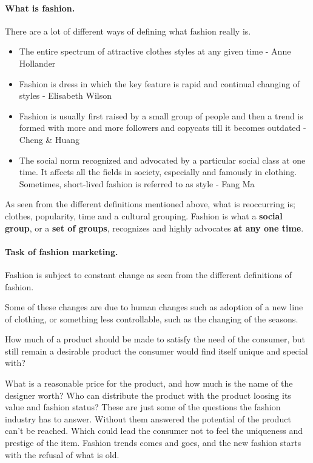 \paragraph{What is fashion.}

There are a lot of different ways of defining what fashion really is.

\begin{itemize}
    \item The entire spectrum of attractive clothes styles at any given time -
    Anne Hollander
    \item Fashion is dress in which the key feature is rapid and continual
    changing of styles - Elisabeth Wilson
    \item Fashion is usually first raised by a small group of people and then a
    trend is formed with more and more followers and copycats till it becomes
    outdated - Cheng \& Huang
    \item The social norm recognized and advocated by a particular social class
    at one time. It affects all the fields in society, especially and famously
    in clothing. Sometimes, short-lived fashion is referred to as style - Fang
    Ma \cite{Fang2012}
\end{itemize}

As seen from the different definitions mentioned above, what is reoccurring is;
clothes, popularity, time and a cultural grouping. Fashion is what a
\textbf{social group}, or a \textbf{set of groups}, recognizes and highly
advocates \textbf{at any one time}.

\paragraph{Task of fashion marketing.}
Fashion is subject to constant change as seen from the different definitions of
fashion.

Some of these changes are due to human changes such as adoption of a new line
of clothing, or something less controllable, such as the changing of the
seasons.

How much of a product should be made to satisfy the need of the consumer, but
still remain a desirable product the consumer would find itself unique and
special with?

What is a reasonable price for the product, and how much is the name of the
designer worth?  Who can distribute the product with the product loosing its
value and fashion status?  These are just some of the questions the fashion
industry has to answer.  Without them answered the potential of the product
can't be reached.  Which could lead the consumer not to feel the uniqueness and
prestige of the item.  Fashion trends comes and goes, and the new fashion
starts with the refusal of what is old.

